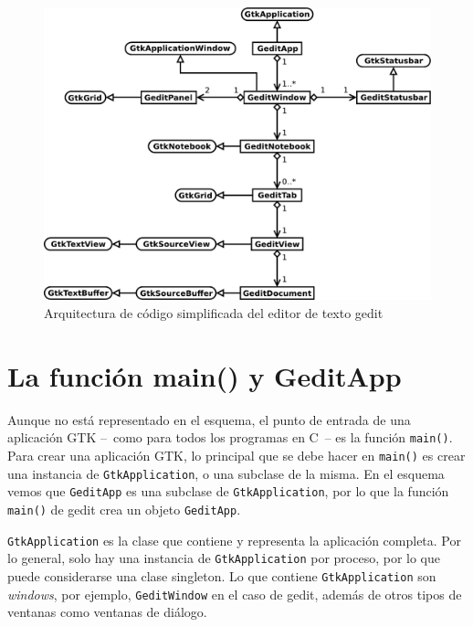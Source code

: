 \begin{figure}
  \begin{center}
    \includegraphics[width=\textwidth]{assets/img/gedit-architecture.pdf}
    \caption{Arquitectura de código simplificada del editor de texto gedit}
    \label{fig:gedit-architecture}
  \end{center}
\end{figure}

\section{La función main() y GeditApp}

Aunque no está representado en el esquema, el punto de entrada de una aplicación GTK --~como para todos los programas en C~-- es la función \lstinline{main()}. Para crear una aplicación GTK, lo principal que se debe hacer en \lstinline{main()} es crear una instancia de \lstinline{GtkApplication}, o una subclase de la misma. En el esquema vemos que \lstinline{GeditApp} es una subclase de \lstinline{GtkApplication}, por lo que la función \lstinline{main()} de gedit crea un objeto \lstinline{GeditApp}.

\lstinline{GtkApplication} es la clase que contiene y representa la aplicación completa. Por lo general, solo hay una instancia de \lstinline{GtkApplication} por proceso, por lo que puede considerarse una clase singleton. Lo que contiene \lstinline{GtkApplication} son \emph{windows}, por ejemplo, \lstinline{GeditWindow} en el caso de gedit, además de otros tipos de ventanas como ventanas de diálogo.

